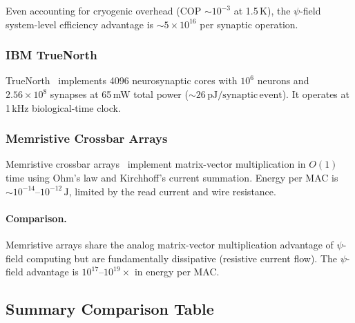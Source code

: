 \documentclass[11pt,twocolumn]{article}
\theoremstyle{definition}
\theoremstyle{remark}
\begin{document}
Even accounting for cryogenic overhead (COP $\sim 10^{-3}$ at 1.5\,K),
the $\psi$-field system-level efficiency advantage is $\sim 5\times
10^{16}$ per synaptic operation.

\subsubsection{IBM TrueNorth}

TrueNorth~\cite{Merolla2014} implements 4096 neurosynaptic cores with
$10^6$ neurons and $2.56\times 10^8$ synapses at 65\,mW total power
($\sim 26\,\mathrm{pJ}/\mathrm{synaptic\,event}$). It operates at
1\,kHz biological-time clock.

\subsubsection{Memristive Crossbar Arrays}

Memristive crossbar arrays~\cite{Prezioso2015,Li2018Nature} implement
matrix-vector multiplication in $O(1)$ time using Ohm's law and
Kirchhoff's current summation. Energy per MAC is $\sim 10^{-14}$--$10^{-12}\,\mathrm{J}$,
limited by the read current and wire resistance.

\paragraph{Comparison.} Memristive arrays share the analog
matrix-vector multiplication advantage of $\psi$-field computing but are
fundamentally dissipative (resistive current flow). The $\psi$-field
advantage is $10^{17}$--$10^{19}\times$ in energy per MAC.

\subsection{Summary Comparison Table}
\end{document}
